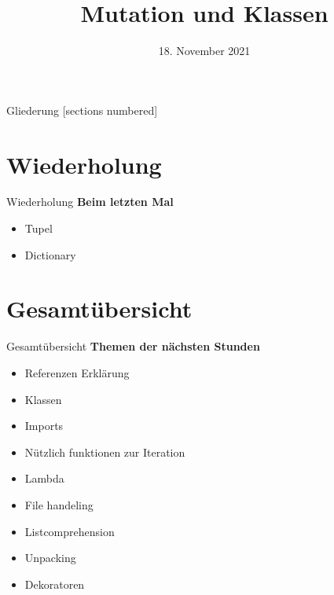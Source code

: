 



\title{Mutation und Klassen}
\date{18. November 2021}


	
\maketitle

\begin{frame}{Gliederung}
	[sections numbered]
	\tableofcontents
\end{frame}

\section{Wiederholung}
\begin{frame}{Wiederholung}
	\textbf{Beim letzten Mal}
	\begin{itemize}
		\item Tupel
		
		\item Dictionary
		
	\end{itemize}		
\end{frame}

\section{Gesamtübersicht}
\begin{frame}{Gesamtübersicht}
	\textbf{Themen der nächsten Stunden}
	\begin{itemize}
		\item \alert{Referenzen Erklärung}
		\item  \alert{Klassen}
		\item Imports
		\item Nützlich funktionen zur Iteration
		\item Lambda
		\item File handeling
		\item Listcomprehension
		\item Unpacking
		\item Dekoratoren
	\end{itemize}
\end{frame}

